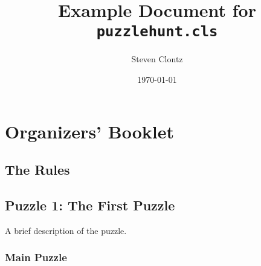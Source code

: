 \documentclass{puzzlehunt}
\title{Example Document for \texttt{puzzlehunt.cls}}
\author{Steven Clontz}
\date{\today}
\begin{document}
\frontmatter %

\puzzlehuntTitlePage %
\tableofcontents %


\mainmatter %

\part{Organizers' Booklet}

\chapter{The Rules}
\lipsum[4-57]

\chapter{Puzzle 1: The First Puzzle}
A brief description of the puzzle.

\section{Main Puzzle}
\end{document}
